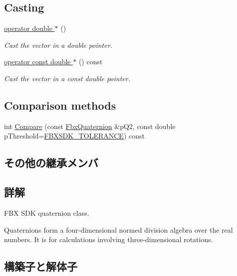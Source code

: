 \subsection*{Casting}
\begin{DoxyCompactItemize}
\item 
\hyperlink{class_fbx_quaternion_a6cef0915096bd157458f8fd02aa3e904}{operator double $\ast$} ()
\begin{DoxyCompactList}\small\item\em Cast the vector in a double pointer. \end{DoxyCompactList}\item 
\hyperlink{class_fbx_quaternion_a0ff9bd06a5800ce91388eb185cdd8dc8}{operator const double $\ast$} () const
\begin{DoxyCompactList}\small\item\em Cast the vector in a const double pointer. \end{DoxyCompactList}\end{DoxyCompactItemize}
\subsection*{Comparison methods}
\begin{DoxyCompactItemize}
\item 
int \hyperlink{class_fbx_quaternion_a6e2200de81315f788b0bf80d553f1f65}{Compare} (const \hyperlink{class_fbx_quaternion}{Fbx\+Quaternion} \&p\+Q2, const double p\+Threshold=\hyperlink{fbxtypes_8h_acf3cd6f208edb42ad9c9abbc1f7feea0}{F\+B\+X\+S\+D\+K\+\_\+\+T\+O\+L\+E\+R\+A\+N\+CE}) const
\end{DoxyCompactItemize}
\subsection*{その他の継承メンバ}


\subsection{詳解}
F\+BX S\+DK quaternion class.

Quaternions form a four-\/dimensional normed division algebra over the real numbers. It is for calculations involving three-\/dimensional rotations. 

\subsection{構築子と解体子}
\mbox{\label{class_fbx_quaternion_acfb222e84428e32ecc6258f1d18fc92b}} 
